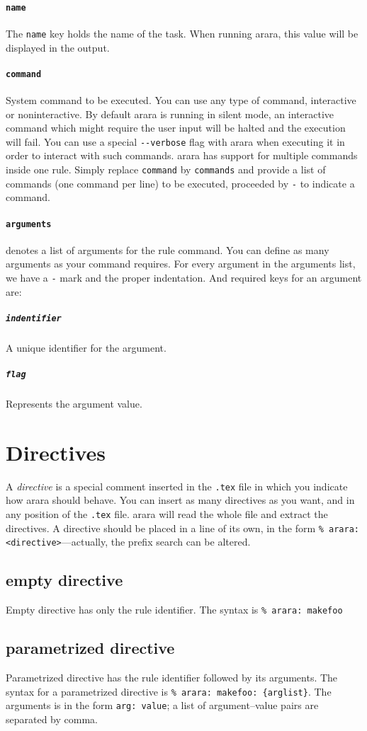 \documentclass[a4paper]{article}
\begin{document}
\paragraph{\texttt{name}} The \verb|name| key holds the name of the task. When running arara, this value will be displayed in the output.
\paragraph{\texttt{command}} System command to be executed. You can use any type of command, interactive or noninteractive. By default arara is running in silent mode, an interactive command which  might require the user input will be halted and the execution will fail. You can use a special \verb|--verbose| flag with arara when executing it in order to interact with such commands.
arara has support for multiple commands inside one rule. Simply replace \verb|command| by \verb|commands| and provide a list of commands (one command per line) to be executed, proceeded by \verb|-| to indicate a command.
\paragraph{\texttt{arguments}} denotes a list of arguments for the rule command. You can define as many arguments as your command requires. For every argument in the arguments list, we have a \verb|-| mark and the proper indentation. And required keys for an argument are:
\subparagraph{\texttt{indentifier}} A unique identifier for the argument. 
\subparagraph{\texttt{flag}} Represents the argument value. 
\section{Directives}
A \emph{directive} is a special comment inserted in the \verb|.tex| file in which you indicate how arara should behave. You can insert as many directives as you want, and in any position of the \verb|.tex| file. arara will read the whole file and extract the directives. 
A directive should be placed in a line of its own, in the form \verb|% arara: <directive>|---actually, the prefix search can be altered.
\subsection*{empty directive}
Empty directive has only the rule identifier. The syntax is \verb|% arara: makefoo|
\subsection*{parametrized directive}
Parametrized directive has the rule identifier followed by its arguments. The syntax for a parametrized directive is \verb|% arara: makefoo: {arglist}|. The arguments is in the form \verb|arg: value|; a list of argument--value pairs are separated by comma.
\end{document}
